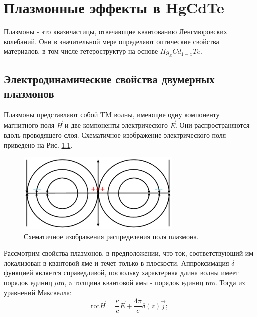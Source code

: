 \documentclass[../main.tex]{subfiles}
\newcommand{\rot}{\text{rot}}
\begin{document}
    \chapter{Плазмонные эффекты в HgCdTe}
    
    Плазмоны - это квазичастицы, отвечающие квантованию 
    Ленгмюровских колебаний. Они в значительной мере 
    определяют оптические свойства материалов, в том числе 
    гетероструктур на основе $Hg_xCd_{1-x}Te$.

    \section{Электродинамические свойства двумерных плазмонов}

    Плазмоны представляют собой TM волны, имеющие одну компоненту 
    магнитного поля $\vec H$ и две компоненты электрического $\vec E$. 
    Они распространяются вдоль проводящего слоя. Схематичное изображение 
    электрического поля приведено на Рис. \ref{plasmons:schematic:fields}.

    \begin{figure}[h]
        \begin{minipage}[h]{1\textwidth}
            \includegraphics[width=0.7\textwidth]{./images/schematic_field.pdf}
            \caption{Схематичное изображения распределения поля плазмона.
            \label{plasmons:schematic:fields}}
        \end{minipage}
    \end{figure}

    Рассмотрим свойства плазмонов, в предположении, что ток,
    соответствующий им локализован в квантовой яме и течет только
    в плоскости. Аппроксимация $\delta$ функцией является 
    справедливой, поскольку характерная длина волны имеет порядок 
    единиц $\mu\text{m}$, a толщина квантовой ямы - порядок единиц 
    $\text{nm}$. Тогда из уравнений Максвелла:
    \begin{equation}
        \rot \vec H = \frac{\kappa}{c} \dot{\vec E} + \frac{4\pi}{c} \delta(z) \vec j;
    \end{equation}
\end{document}
